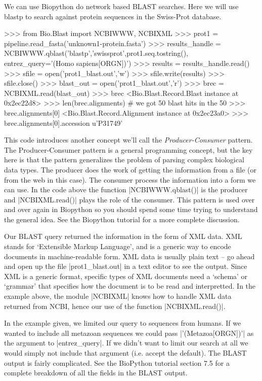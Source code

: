 We can use Biopython do network based BLAST searches. Here we will use blastp to search against protein sequences in the Swiss-Prot database.

\begin{python}
>>> from Bio.Blast import NCBIWWW, NCBIXML
>>> prot1 = pipeline.read_fasta('unknown1-protein.fasta')
>>> results_handle = NCBIWWW.qblast('blastp','swissprot',prot1.seq.tostring(), entrez_query='(Homo sapiens[ORGN])')
>>> results = results_handle.read()
>>> sfile = open('prot1_blast.out','w')
>>> sfile.write(results)
>>> sfile.close()
>>> blast_out = open('prot1_blast.out','r')
>>> brec = NCBIXML.read(blast_out)
>>> brec
<Bio.Blast.Record.Blast instance at 0x2ec22d8>
>>> len(brec.alignments) # we got 50 blast hits in the 
50
>>> brec.alignments[0]
<Bio.Blast.Record.Alignment instance at 0x2ec23a0>
>>> brec.alignments[0].accession
u'P31749'    
\end{python}

This code introduces another concept we'll call the \emph{Producer-Consumer} pattern. The Producer-Consumer pattern is a general programming concept, but the key here is that the pattern generalizes the problem of parsing complex biological data types. The producer does the work of getting the information from a file (or from the web in this case). The consumer process the information into a form we can use. In the code above the function |NCBIWWW.qblast()| is the producer and |NCBIXML.read()| plays the role of the consumer. This pattern is used over and over again in Biopython so you should spend some time trying to understand the general idea. See the Biopython tutorial for a more complete discussion.

Our BLAST query returned the information in the form of XML data.  XML stands for `Extensible Markup Language', and is a generic way to encode documents in machine-readable form.  XML data is usually plain text -- go ahead and open up the file |prot1_blast.out| in a text editor to see the output. Since XML is a generic format, specific types of XML documents need a `schema' or `grammar' that specifies how the document is to be read and interpretted. In the example above, the module |NCBIXML| knows how to handle XML data returned from NCBI, hence our use of the function |NCBIXML.read()|.

In the example given, we limited our query to sequences from humans. If we wanted to include all metazoan sequences we could pass |'(Metazoa[ORGN])'| as the argument to |entrez_query|. If we didn't want to limit our search at all we would simply not include that argument (i.e. accept the default). The BLAST output is fairly complicated. See the BioPython tutorial section 7.5 for a complete breakdown of all the fields in the BLAST output.

